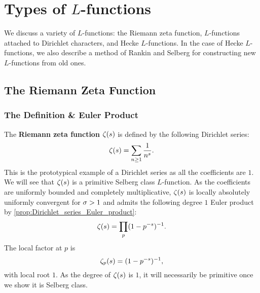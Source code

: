 \chapter{Types of \texorpdfstring{$L$}{L}-functions}
  We discuss a variety of $L$-functions: the Riemann zeta function, $L$-functions attached to Dirichlet characters, and Hecke $L$-functions. In the case of Hecke $L$-functions, we also describe a method of Rankin and Selberg for constructing new $L$-functions from old ones.
  \section{The Riemann Zeta Function}
    \subsection*{The Definition \& Euler Product}
      The \textbf{Riemann zeta function} $\zeta(s)$ is defined by the following Dirichlet series:
      \[
        \zeta(s) = \sum_{n \ge 1}\frac{1}{n^{s}}.
      \]
      This is the prototypical example of a Dirichlet series as all the coefficients are $1$. We will see that $\zeta(s)$ is a primitive Selberg class $L$-function. As the coefficients are uniformly bounded and completely multiplicative, $\zeta(s)$ is locally absolutely uniformly convergent for $\sigma > 1$ and admits the following degree $1$ Euler product by \cref{prop:Dirichlet_series_Euler_product}:
      \[
        \zeta(s) = \prod_{p}(1-p^{-s})^{-1}.
      \]
      The local factor at $p$ is
      \[
        \zeta_{p}(s) = (1-p^{-s})^{-1},
      \]
      with local root $1$. As the degree of $\zeta(s)$ is $1$, it will necessarily be primitive once we show it is Selberg class.
